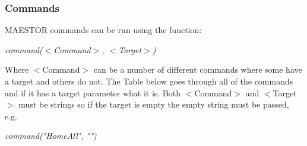 \documentclass[12pt]{article}
\begin{document}
\subsubsection{Commands}

MAESTOR commands can be run using the function: 

\begin{center}
	\textit{command($<$Command$>$, $<$Target$>$)}
\end{center}

Where $<$Command$>$ can be a number of different commands where some have a target and others do not. The Table below goes through all of the commands and if it has a target parameter what it is. Both $<$Command$>$ and $<$Target$>$ must be strings so if the target is empty the empty string must be passed, e.g.

\begin{center}
	\textit{command("HomeAll", "")}
\end{center}
\end{document}
